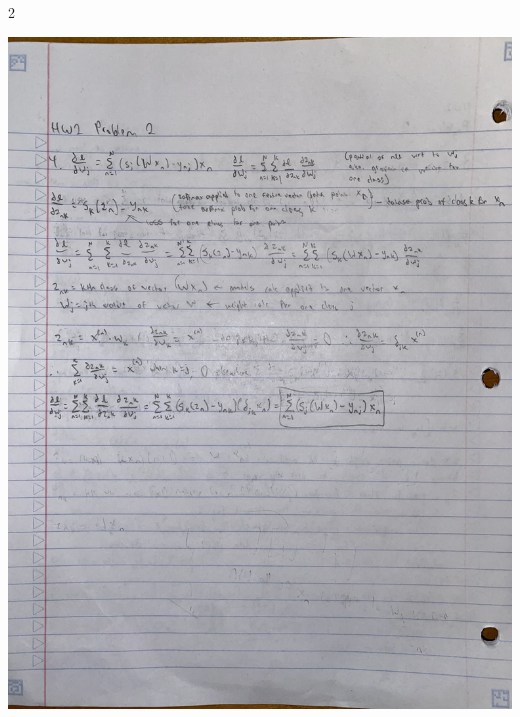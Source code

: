 \documentclass[submit]{harvardml}
\begin{document}
\begin{sol}{}{2}
\begin{center}
    \includegraphics[angle=270,width=0.9\linewidth]{images/Problem_2_4.JPG}\\
  \end{center}
\end{sol}
\end{document}

